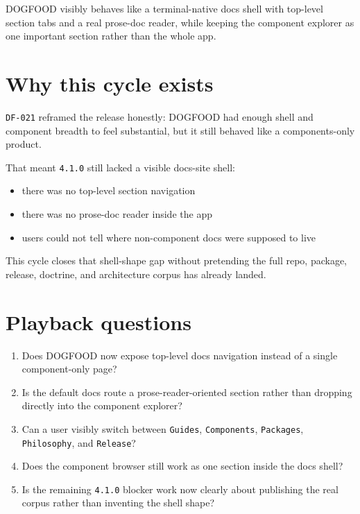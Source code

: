 DOGFOOD visibly behaves like a terminal-native docs shell with top-level section tabs and a real prose-doc reader, while keeping the component explorer as one important section rather than the whole app.

\section{Why this cycle exists}\label{record-083-why-this-cycle-exists}

\texttt{D\allowbreak{}F\allowbreak{}-\allowbreak{}0\allowbreak{}2\allowbreak{}1} reframed the release honestly: DOGFOOD had enough shell and component breadth to feel substantial, but it still behaved like a components-only product.

That meant \texttt{4\allowbreak{}.\allowbreak{}1\allowbreak{}.\allowbreak{}0} still lacked a visible docs-site shell:

\begin{itemize}
\tightlist
\item
  there was no top-level section navigation
\item
  there was no prose-doc reader inside the app
\item
  users could not tell where non-component docs were supposed to live
\end{itemize}

This cycle closes that shell-shape gap without pretending the full repo, package, release, doctrine, and architecture corpus has already landed.

\section{Playback questions}\label{record-083-playback-questions}

\begin{enumerate}
\def\labelenumi{\arabic{enumi}.}
\tightlist
\item
  Does DOGFOOD now expose top-level docs navigation instead of a single component-only page?
\item
  Is the default docs route a prose-reader-oriented section rather than dropping directly into the component explorer?
\item
  Can a user visibly switch between \texttt{G\allowbreak{}u\allowbreak{}i\allowbreak{}d\allowbreak{}e\allowbreak{}s}, \texttt{C\allowbreak{}o\allowbreak{}m\allowbreak{}p\allowbreak{}o\allowbreak{}n\allowbreak{}e\allowbreak{}n\allowbreak{}t\allowbreak{}s}, \texttt{P\allowbreak{}a\allowbreak{}c\allowbreak{}k\allowbreak{}a\allowbreak{}g\allowbreak{}e\allowbreak{}s}, \texttt{P\allowbreak{}h\allowbreak{}i\allowbreak{}l\allowbreak{}o\allowbreak{}s\allowbreak{}o\allowbreak{}p\allowbreak{}h\allowbreak{}y}, and \texttt{R\allowbreak{}e\allowbreak{}l\allowbreak{}e\allowbreak{}a\allowbreak{}s\allowbreak{}e}?
\item
  Does the component browser still work as one section inside the docs shell?
\item
  Is the remaining \texttt{4\allowbreak{}.\allowbreak{}1\allowbreak{}.\allowbreak{}0} blocker work now clearly about publishing the real corpus rather than inventing the shell shape?
\end{enumerate}

